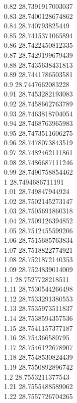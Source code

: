 {0.82	28.7391917003037\\
0.83	28.7400128674862\\
0.84	28.740793825449\\
0.85	28.7415371065894\\
0.86	28.7422450812335\\
0.87	28.7429199679439\\
0.88	28.7435638431813\\
0.89	28.7441786503581\\
0.9	28.7447662083228\\
0.91	28.7453282193083\\
0.92	28.7458662763789\\
0.93	28.7463818704054\\
0.94	28.7468763965983\\
0.95	28.7473511606275\\
0.96	28.7478073843519\\
0.97	28.7482462111861\\
0.98	28.7486687111246\\
0.99	28.7490758854462\\
1	28.7494686711191\\
1.01	28.749847944924\\
1.02	28.7502145273147\\
1.03	28.7505691860318\\
1.04	28.7509126394852\\
1.05	28.7512455599206\\
1.06	28.7515685763834\\
1.07	28.7518822774921\\
1.08	28.7521872140353\\
1.09	28.7524839014009\\
1.1	28.7527728218511\\
1.11	28.7530544266498\\
1.12	28.7533291380553\\
1.13	28.7535973511837\\
1.14	28.7538594357536\\
1.15	28.7541157377187\\
1.16	28.754366580795\\
1.17	28.7546122678907\\
1.18	28.7548530824439\\
1.19	28.7550892896742\\
1.2	28.7553211377543\\
1.21	28.7555488589062\\
1.22	28.7557726704265\\
}
